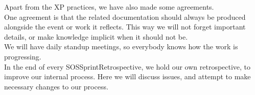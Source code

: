 Apart from the \gls{XP} practices, we have also made some agreements.\\
One agreement is that the related documentation should always be produced alongside the event or work it reflects. This way we will not forget important details, or make knowledge implicit when it should not be.\\
We will have daily standup meetings, so everybody knows how the work is progressing.\\
In the end of every \gls{SOSSprintRetrospective}, we hold our own retrospective, to improve our internal process. Here we will discuss issues, and attempt to make necessary changes to our process.\\
